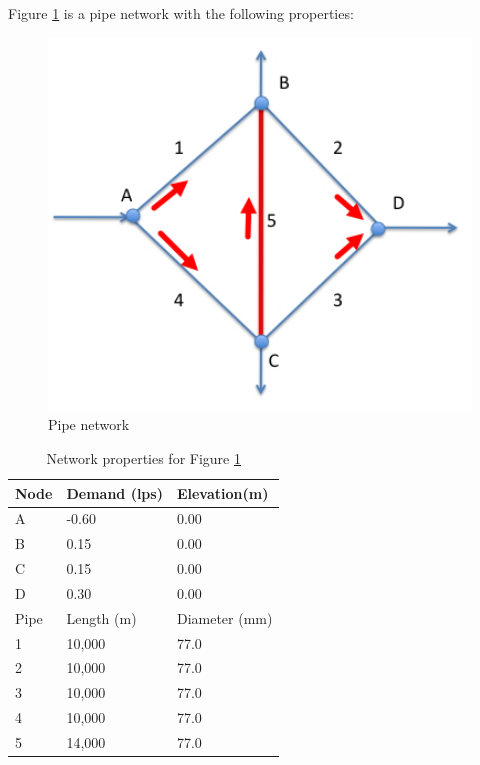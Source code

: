 \documentclass[11pt]{article}
\begin{document}
\begin{enumerate}
Figure \ref{fig:wheatstone_bridge} is a pipe network with the following properties:
\begin{figure}[h!] %
\centering
   \includegraphics[width=5.1in]{wheatstone_bridge.jpg}
   \caption{Pipe network}
   \label{fig:wheatstone_bridge} 
\end{figure}

\begin{table}[h!]
   \centering
   \caption{Network properties for Figure \ref{fig:wheatstone_bridge}}
\begin{tabular}{lll}
\hline
Node&Demand (lps)&  Elevation(m) \\
\hline
A & -0.60 & 0.00 \\
B &  0.15   & 0.00 \\
C & 0.15 & 0.00 \\
D & 0.30 & 0.00 \\
\hline
Pipe& Length (m)&  Diameter (mm)\\
\hline
1 & 10,000 & 77.0 \\
2 & 10,000 & 77.0 \\
3 & 10,000 & 77.0 \\
4 & 10,000 & 77.0 \\
5 & 14,000 & 77.0 \\
\end{tabular}
\label{tab:wheatstone1}
\normalsize
\end{table}
\clearpage


\end{enumerate}
\end{document}
